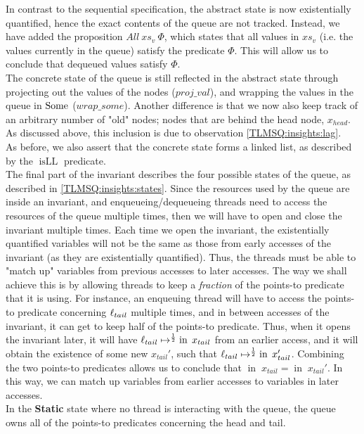 \documentclass[twoside,11pt,openright]{report}
\newcommand{\isLL}{\operatorname{isLL}}
\newcommand{\nIn}[1]{\operatorname{in} \; #1}
\newcommand{\StaticState}{\textbf{Static}}
\begin{document}
In contrast to the sequential specification, the abstract state is now existentially quantified, hence the exact contents of the queue are not tracked. Instead, we have added the proposition $All \ xs_v \ \Phi$, which states that all values in $xs_v$ (i.e. the values currently in the queue) satisfy the predicate $\Phi$. This will allow us to conclude that dequeued values satisfy $\Phi$.\\
The concrete state of the queue is still reflected in the abstract state through projecting out the values of the nodes ($proj\_val$), and wrapping the values in the queue in $\operatorname{Some}$ ($wrap\_some$). Another difference is that we now also keep track of an arbitrary number of "old" nodes; nodes that are behind the head node, $x_{head}$. As discussed above, this inclusion is due to observation \ref{TLMSQ:insights:lag}.\\
As before, we also assert that the concrete state forms a linked list, as described by the $\isLL$ predicate.\\
The final part of the invariant describes the four possible states of the queue, as described in \ref{TLMSQ:insights:states}. Since the resources used by the queue are inside an invariant, and enqueueing/dequeueing threads need to access the resources of the queue multiple times, then we will have to open and close the invariant multiple times. Each time we open the invariant, the existentially quantified variables will not be the same as those from early accesses of the invariant (as they are existentially quantified). Thus, the threads must be able to "match up" variables from previous accesses to later accesses. The way we shall achieve this is by allowing threads to keep a \textit{fraction} of the points-to predicate that it is using. For instance, an enqueuing thread will have to access the points-to predicate concerning $\ell_{tail}$ multiple times, and in between accesses of the invariant, it can get to keep half of the points-to predicate. Thus, when it opens the invariant later, it will have $\loc_{tail} \mapsto^{\frac{1}{2}} \nIn{x_{tail}}$ from an earlier access, and it will obtain the existence of some new $x_{tail}'$, such that $\loc_{tail} \mapsto^{\frac{1}{2}} \nIn{x_{tail}'}$. Combining the two points-to predicates allows us to conclude that $\nIn{x_{tail}} = \nIn{x_{tail}'}$. In this way, we can match up variables from earlier accesses to variables in later accesses.\\
In the \StaticState{} state where no thread is interacting with the queue, the queue owns all of the points-to predicates concerning the head and tail.\\
\end{document}
